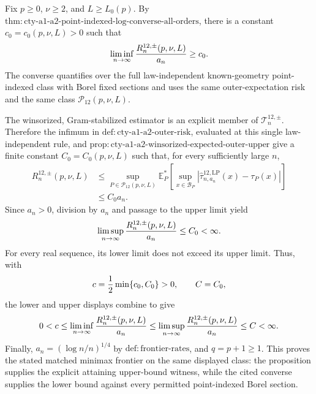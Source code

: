 Fix \(p\geq0\), \(\nu\geq2\), and \(L\geq L_0(p)\).  By \(\mathrm{thm:cty\text{-}a1\text{-}a2\text{-}point\text{-}indexed\text{-}log\text{-}converse\text{-}all\text{-}orders}\), there is a constant \(c_0=c_0(p,\nu,L)>0\) such that
\[
 \liminf_{n\to\infty}{R_n^{12,\pm}(p,\nu,L)\over a_n}\geq c_0.
\]
The converse quantifies over the full law-independent known-geometry point-indexed class with Borel fixed sections and uses the same outer-expectation risk and the same class \(\mathcal P_{12}(p,\nu,L)\).

The winsorized, Gram-stabilized estimator is an explicit member of \(\mathcal T_n^{12,\pm}\).  Therefore the infimum in \(\mathrm{def:cty\text{-}a1\text{-}a2\text{-}outer\text{-}risk}\), evaluated at this single law-independent rule, and \(\mathrm{prop:cty\text{-}a1\text{-}a2\text{-}winsorized\text{-}expected\text{-}outer\text{-}upper}\) give a finite constant \(C_0=C_0(p,\nu,L)\) such that, for every sufficiently large \(n\),
\[
 \begin{split}
 R_n^{12,\pm}(p,\nu,L)
 &\leq \sup_{P\in\mathcal P_{12}(p,\nu,L)}
 \mathbb E_P^*\!\left[
 \sup_{x\in\mathcal B_P}
 |\widehat\tau^{12,\mathrm{LP}}_{n,a_n}(x)-\tau_P(x)|
 \right]\\
 &\leq C_0a_n.
 \end{split}
\]
Since \(a_n>0\), division by \(a_n\) and passage to the upper limit yield
\[
 \limsup_{n\to\infty}{R_n^{12,\pm}(p,\nu,L)\over a_n}\leq C_0<\infty.
\]
For every real sequence, its lower limit does not exceed its upper limit.  Thus, with
\[
 c={1\over2}\min\{c_0,C_0\}>0,
 \qquad C=C_0,
\]
the lower and upper displays combine to give
\[
 0<c\leq\liminf_{n\to\infty}{R_n^{12,\pm}(p,\nu,L)\over a_n}
 \leq\limsup_{n\to\infty}{R_n^{12,\pm}(p,\nu,L)\over a_n}
 \leq C<\infty.
\]
Finally, \(a_n=(\log n/n)^{1/4}\) by \(\mathrm{def:frontier\text{-}rates}\), and \(q=p+1\geq1\).  This proves the stated matched minimax frontier on the same displayed class: the proposition supplies the explicit attaining upper-bound witness, while the cited converse supplies the lower bound against every permitted point-indexed Borel section.